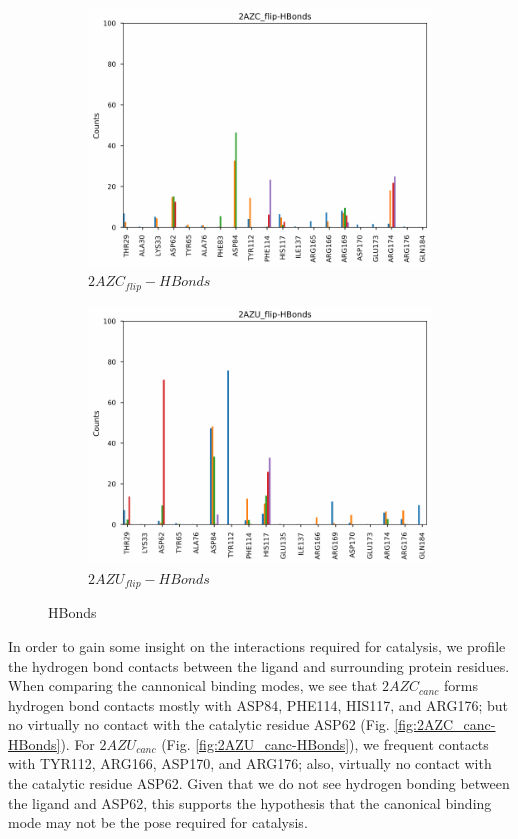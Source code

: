 \documentclass[fleqn,10pt]{wlscirep}
\begin{document}
\begin{figure}[!ht]
\begin{subfigure}{.45\textwidth}
     \includegraphics[width=.95\linewidth]{2AZC_flip/2AZC_flip-HBonds.pdf}
     \caption{$2AZC_{flip}-HBonds$}
     \label{fig:2AZC_flip-HBonds}
   \end{subfigure}
    \begin{subfigure}{.45\textwidth}
     \centering
     \includegraphics[width=.95\linewidth]{2AZU_flip/2AZU_flip-HBonds.pdf}
     \caption{$2AZU_{flip}-HBonds$}
     \label{fig:2AZU_flip-HBonds}
   \end{subfigure}
\caption{HBonds}
\label{fig:HBonds}
\end{figure}  

In order to gain some insight on the interactions required for catalysis, we profile the hydrogen bond contacts between the ligand and surrounding protein residues.
When comparing the cannonical binding modes, we see that $2AZC_{canc}$ forms hydrogen bond contacts mostly with ASP84, PHE114, HIS117, and ARG176; but no virtually no contact with the catalytic residue ASP62 (Fig. \ref{fig:2AZC_canc-HBonds}).
For $2AZU_{canc}$ (Fig. \ref{fig:2AZU_canc-HBonds}), we frequent contacts with TYR112, ARG166, ASP170, and ARG176; also, virtually no contact with the catalytic residue ASP62.
Given that we do not see hydrogen bonding between the ligand and ASP62, this supports the hypothesis that the canonical binding mode may not be the pose required for catalysis.
\end{document}
